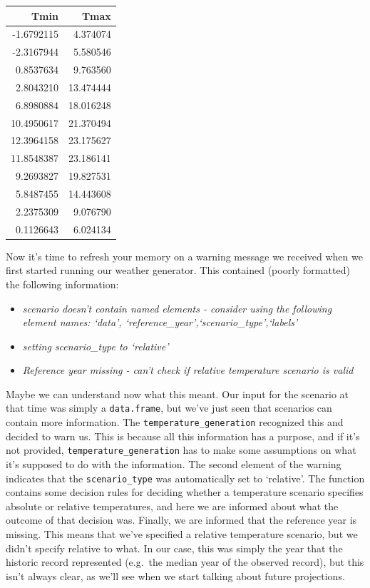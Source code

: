 \documentclass[
]{book}
\providecommand{\tightlist}{%
  \setlength{\itemsep}{0pt}\setlength{\parskip}{0pt}}
\begin{document}
\begingroup\fontsize{10}{12}\selectfont

\begin{tabular}{r|r}
\hline
Tmin & Tmax\\
\hline
-1.6792115 & 4.374074\\
\hline
-2.3167944 & 5.580546\\
\hline
0.8537634 & 9.763560\\
\hline
2.8043210 & 13.474444\\
\hline
6.8980884 & 18.016248\\
\hline
10.4950617 & 21.370494\\
\hline
12.3964158 & 23.175627\\
\hline
11.8548387 & 23.186141\\
\hline
9.2693827 & 19.827531\\
\hline
5.8487455 & 14.443608\\
\hline
2.2375309 & 9.076790\\
\hline
0.1126643 & 6.024134\\
\hline
\end{tabular}
\endgroup{}

Now it's time to refresh your memory on a warning message we received when we first started running our weather generator. This contained (poorly formatted) the following information:

\begin{itemize}
\tightlist
\item
  \emph{scenario doesn't contain named elements - consider using the following element names: `data', `reference\_year',`scenario\_type',`labels'}
\item
  \emph{setting scenario\_type to `relative'}
\item
  \emph{Reference year missing - can't check if relative temperature scenario is valid}
\end{itemize}

Maybe we can understand now what this meant. Our input for the scenario at that time was simply a \texttt{data.frame}, but we've just seen that scenarios can contain more information. The \texttt{temperature\_generation} recognized this and decided to warn us. This is because all this information has a purpose, and if it's not provided, \texttt{temperature\_generation} has to make some assumptions on what it's supposed to do with the information. The second element of the warning indicates that the \texttt{scenario\_type} was automatically set to `relative'. The function contains some decision rules for deciding whether a temperature scenario specifies absolute or relative temperatures, and here we are informed about what the outcome of that decision was. Finally, we are informed that the reference year is missing. This means that we've specified a relative temperature scenario, but we didn't specify relative to what. In our case, this was simply the year that the historic record represented (e.g.~the median year of the observed record), but this isn't always clear, as we'll see when we start talking about future projections.
\end{document}
